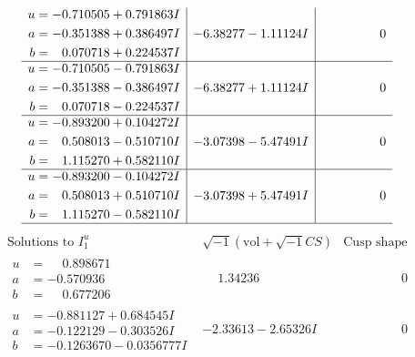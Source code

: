 \documentclass[1p]{elsarticle_modified}
\theoremstyle{definition}
\newcommand{\I}{\sqrt{-1}}
\begin{document}
$$\begin{array}{c|c|c}
\begin{aligned}
u &= -0.710505 + 0.791863 I \\
a &= -0.351388 + 0.386497 I \\
b &= \phantom{-}0.070718 + 0.224537 I\end{aligned}
 & -6.38277 - 1.11124 I & \phantom{-0.000000 } 0 \\ \hline\begin{aligned}
u &= -0.710505 - 0.791863 I \\
a &= -0.351388 - 0.386497 I \\
b &= \phantom{-}0.070718 - 0.224537 I\end{aligned}
 & -6.38277 + 1.11124 I & \phantom{-0.000000 } 0 \\ \hline\begin{aligned}
u &= -0.893200 + 0.104272 I \\
a &= \phantom{-}0.508013 - 0.510710 I \\
b &= \phantom{-}1.115270 + 0.582110 I\end{aligned}
 & -3.07398 - 5.47491 I & \phantom{-0.000000 } 0 \\ \hline\begin{aligned}
u &= -0.893200 - 0.104272 I \\
a &= \phantom{-}0.508013 + 0.510710 I \\
b &= \phantom{-}1.115270 - 0.582110 I\end{aligned}
 & -3.07398 + 5.47491 I & \phantom{-0.000000 } 0\\
 \hline 
 \end{array}$$\newpage$$\begin{array}{c|c|c}  
\text{Solutions to }I^u_{1}& \I (\text{vol} + \sqrt{-1}CS) & \text{Cusp shape}\\
 \hline 
\begin{aligned}
u &= \phantom{-}0.898671\phantom{ +0.000000I} \\
a &= -0.570936\phantom{ +0.000000I} \\
b &= \phantom{-}0.677206\phantom{ +0.000000I}\end{aligned}
 & \phantom{-}1.34236\phantom{ +0.000000I} & \phantom{-0.000000 } 0 \\ \hline\begin{aligned}
u &= -0.881127 + 0.684545 I \\
a &= -0.122129 - 0.303526 I \\
b &= -0.1263670 - 0.0356777 I\end{aligned}
 & -2.33613 - 2.65326 I & \phantom{-0.000000 } 0 \\ \hline\begin{aligned}

\end{aligned}
\end{array}$$
\end{document}

